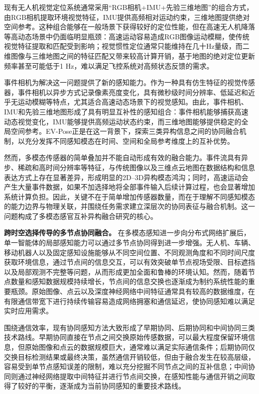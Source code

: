 现有无人机视觉定位系统通常采用“RGB相机+IMU+先验三维地图”的组合方式，由RGB相机提取环境视觉特征，IMU提供高频相对运动约束，三维地图提供绝对空间参考。这种组合能够在一般场景下获得较好的定位性能，但在高速无人机降落等高动态场景中仍面临明显瓶颈：高速运动容易造成RGB图像运动模糊，使传统视觉特征提取和匹配受到影响；视觉惯性定位通常只能维持在几十Hz量级，而二维图像与三维地图之间的特征匹配又带来较高计算开销，基于地图的绝对定位更新频率甚至可能低于1 Hz，难以满足飞控系统对高频状态反馈的需求。

事件相机为解决这一问题提供了新的感知能力。作为一种具有仿生特征的视觉传感器，事件相机以异步方式记录像素亮度变化，具有微秒级时间分辨率、低延迟和近乎无运动模糊等特点，尤其适合高速动态场景下的视觉感知。由此，事件相机、IMU和先验三维地图形成了具有明显互补性的感知组合：事件相机能够捕获高速动态视觉变化，IMU能够提供高频运动状态约束，而三维地图能够提供稳定的全局空间参考。EV-Pose正是在这一背景下，探索三类异构信息之间的协同融合机制，以充分发挥不同感知模态在时间、空间和全局参考维度上的互补优势。

然而，多模态传感器的简单叠加并不能自动形成有效的融合能力。事件流具有异步、稀疏和高时间分辨率等特征，与传统图像以及三维点云地图在数据结构和信息表达方式上存在显著差异，形成明显的2D–3D异构模态鸿沟；同时，高速运动会产生大量事件数据，如果不加选择地将全部事件输入后续计算过程，也会显著增加系统计算负担。因此，关键不在于简单增加传感器数量，而在于理解不同感知模态的能力边界与物理关联，并围绕任务需求建立深层次的协同表征与融合机制。这一问题构成了多模态感官互补异构融合研究的核心。

\textbf{跨时空选择传导的多节点协同融合。}
在多模态感知进一步向分布式网络扩展后，单一智能体的局部感知能力可以通过多节点协同得到进一步增强。无人机、车辆、移动机器人以及固定感知设施能够从不同空间位置、不同观测角度和不同时间尺度获取环境信息，通过节点间的信息交互，可以有效突破单节点视场受限、目标遮挡以及局部观测不完整等问题，从而形成更加全面和鲁棒的环境认知。然而，随着节点数量和感知数据规模持续增长，节点间的信息交换也逐渐成为制约系统性能的重要瓶颈。原始图像、点云以及深度神经网络中间特征通常具有较高的数据维度，在有限通信带宽下进行持续传输容易造成网络拥塞和通信延迟，使协同感知难以满足实时应用需求。

围绕通信效率，现有协同感知方法大致形成了早期协同、后期协同和中间协同三类技术路线。早期协同直接在节点之间交换原始传感数据，可以最大程度保留环境信息，但原始图像和点云的数据规模巨大，通常难以满足实际通信条件；后期协同仅交换目标检测结果或最终决策，虽然通信开销较低，但由于融合发生在较高层级，容易受到单节点感知误差的限制，难以充分挖掘不同节点之间的互补信息；中间协同则通过神经网络提取中间特征并进行节点间交换，在感知性能与通信开销之间取得了较好的平衡，逐渐成为当前协同感知的重要技术路线。

